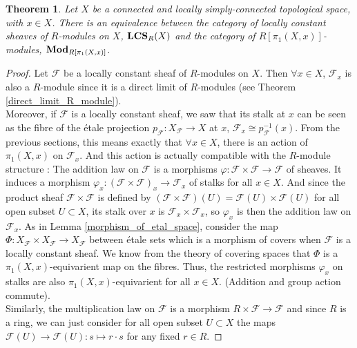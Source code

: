 \documentclass{article}
\theoremstyle{plain}
\newtheorem{theorem}{Theorem}[subsection]
\theoremstyle{definition}
\DeclareMathOperator{\LCS}{\bf{LCS}}
\DeclareMathOperator{\Mod}{\bf{Mod}}
\begin{document}
\begin{theorem}
\label{equi_R_mod_loc_cst_sh}
    Let $X$ be a connected and locally simply-connected topological space, with $x\in X$.
    There is an equivalence between the category of locally constant sheaves of $R$-modules on $X$, $\LCS_R(X)$ and the category of $R[\pi_1(X,x)]$-modules, $\Mod_{R[\pi_1(X,x)]}$.
\end{theorem}
\begin{proof}

    Let $\mathcal{F}$ be a locally constant sheaf of $R$-modules on $X$. Then $\forall x\in X$, $\mathcal{F}_x$ is also a $R$-module since it is a direct limit of $R$-modules (see Theorem \ref{direct_limit_R_module}).\\
    Moreover, if $\mathcal{F}$ is a locally constant sheaf, we saw that its stalk at $x$ can be seen as the fibre of the \'etale projection $p_{\mathcal{F}} : X_{\mathcal{F}}\rightarrow X$ at $x$, $\mathcal{F}_x \cong p_{\mathcal{F}}^{-1}(x)$. From the previous sections, this means exactly that $\forall x\in X$, there is an action of $\pi_1(X,x)$ on $\mathcal{F}_x$.
    And this action is actually compatible with the $R$-module structure :
    The addition law on $\mathcal{F}$ is a morphisms $\varphi :\mathcal{F}\times \mathcal{F}\rightarrow \mathcal{F}$ of sheaves. It induces a morphism  $\varphi_x : (\mathcal{F}\times \mathcal{F})_x \rightarrow \mathcal{F}_x$ of stalks for all $x\in X$. 
    And since the product sheaf $\mathcal{F}\times \mathcal{F}$ is defined by $(\mathcal{F}\times\mathcal{F})(U) =\mathcal{F}(U)\times\mathcal{F}(U)$ for all open subset $U\subset X$, its stalk over $x$ is $\mathcal{F}_x\times \mathcal{F}_x$, so $\varphi_x$ is then the addition law on $\mathcal{F}_x$.
    As in Lemma \ref{morphism_of_etal_space}, consider the map $\Phi : X_{\mathcal{F}}\times X_{\mathcal{F}}\rightarrow X_{\mathcal{F}}$ between \'etale sets which is a morphism of covers when $\mathcal{F}$ is a locally constant sheaf.
    We know from the theory of covering spaces that $\Phi$ is a $\pi_1(X,x)$-equivarient map on the fibres.
    Thus, the restricted morphisms $\varphi_x$ on stalks are also $\pi_1(X,x)$-equivarient for all $x\in X$. (Addition and group action commute).\\
    Similarly, the multiplication law on $\mathcal{F}$ is a morphism $R\times \mathcal{F \rightarrow \mathcal{F}}$ and since $R$ is a ring, we can just consider for all open subset $U\subset X$ the maps $\mathcal{F}(U)\rightarrow\mathcal{F}(U): s\mapsto r\cdot s$ for any fixed $r\in R$. 

\end{proof}
\end{document}
